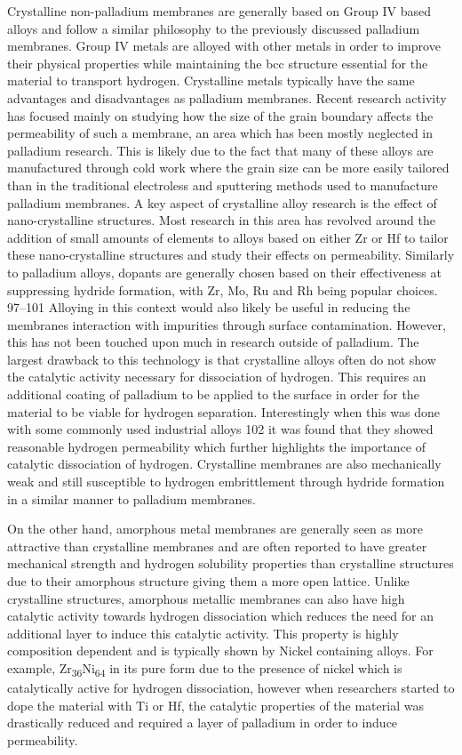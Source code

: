 Crystalline non-palladium membranes are generally based on Group IV based alloys and follow a 
similar philosophy to the previously discussed palladium membranes. Group IV metals are 
alloyed with other metals in order to improve their physical properties while maintaining the 
bcc structure essential for the material to transport hydrogen. Crystalline metals typically 
have the same advantages and disadvantages as palladium membranes. Recent research activity 
has focused mainly on studying how the size of the grain boundary affects the permeability 
of such a membrane, an area which has been mostly neglected in palladium research. This is 
likely due to the fact that many of these alloys are manufactured through cold work where the 
grain size can be more easily tailored than in the traditional electroless and sputtering 
methods used to manufacture palladium membranes. A key aspect of crystalline alloy research 
is the effect of nano-crystalline structures. Most research in this area has revolved around 
the addition of small amounts of elements to alloys based on either Zr or Hf to tailor these 
nano-crystalline structures and study their effects on permeability. Similarly to palladium 
alloys, dopants are generally chosen based on their effectiveness at suppressing hydride
formation, with Zr, Mo, Ru and Rh being popular choices. 97–101 Alloying in this context 
would also likely be useful in reducing the membranes interaction with impurities through 
 surface contamination. However, this has not been touched upon much in research outside of 
 palladium. The largest drawback to this technology is that crystalline alloys often do not 
 show the catalytic activity necessary for dissociation of hydrogen. This requires an 
 additional coating of palladium to be applied to the surface in order for the material to be 
 viable for hydrogen separation. Interestingly when this was done with some commonly used 
 industrial alloys 102 it was found that they showed reasonable hydrogen permeability which 
 further highlights the importance of catalytic dissociation of hydrogen. Crystalline 
 membranes are also mechanically weak and still susceptible to hydrogen embrittlement through 
 hydride formation in a similar manner to palladium membranes.

 On the other hand, amorphous metal membranes are generally seen as more attractive than 
 crystalline membranes and are often reported to have greater mechanical strength and 
 hydrogen solubility properties than crystalline structures due to their amorphous structure 
 giving them a more open lattice. Unlike crystalline structures, amorphous metallic membranes 
 can also have high catalytic activity towards hydrogen dissociation which reduces the need 
 for an additional layer to induce this catalytic activity. This property is highly 
 composition dependent and is typically shown by Nickel containing alloys. For example, 
 Zr\textsubscript{36}Ni\textsubscript{64} in its pure form due to the presence of nickel 
 which is catalytically active for hydrogen dissociation, however when researchers started to 
 dope the material with Ti or Hf, the catalytic properties of the material was drastically 
 reduced and required a layer of palladium in order to induce permeability. 
 
